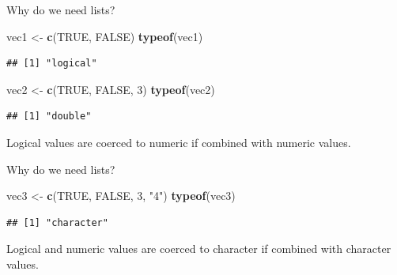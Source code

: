 \documentclass[ignorenonframetext,]{beamer}
\newenvironment{Shaded}{\begin{snugshade}}{\end{snugshade}}
\newcommand{\DecValTok}[1]{\textcolor[rgb]{0.00,0.00,0.81}{#1}}
\newcommand{\KeywordTok}[1]{\textcolor[rgb]{0.13,0.29,0.53}{\textbf{#1}}}
\newcommand{\NormalTok}[1]{#1}
\newcommand{\OtherTok}[1]{\textcolor[rgb]{0.56,0.35,0.01}{#1}}
\newcommand{\StringTok}[1]{\textcolor[rgb]{0.31,0.60,0.02}{#1}}
\begin{document}
\begin{frame}[fragile]{Why do we need lists?}
\protect\hypertarget{why-do-we-need-lists-1}{}

\begin{Shaded}
\begin{Highlighting}[]
\NormalTok{vec1 <-}\StringTok{ }\KeywordTok{c}\NormalTok{(}\OtherTok{TRUE}\NormalTok{, }\OtherTok{FALSE}\NormalTok{)}
\KeywordTok{typeof}\NormalTok{(vec1)}
\end{Highlighting}
\end{Shaded}

\begin{verbatim}
## [1] "logical"
\end{verbatim}

\begin{Shaded}
\begin{Highlighting}[]
\NormalTok{vec2 <-}\StringTok{ }\KeywordTok{c}\NormalTok{(}\OtherTok{TRUE}\NormalTok{, }\OtherTok{FALSE}\NormalTok{, }\DecValTok{3}\NormalTok{)}
\KeywordTok{typeof}\NormalTok{(vec2)}
\end{Highlighting}
\end{Shaded}

\begin{verbatim}
## [1] "double"
\end{verbatim}

Logical values are coerced to numeric if combined with numeric values.

\end{frame}

\begin{frame}[fragile]{Why do we need lists?}
\protect\hypertarget{why-do-we-need-lists-2}{}

\begin{Shaded}
\begin{Highlighting}[]
\NormalTok{vec3 <-}\StringTok{ }\KeywordTok{c}\NormalTok{(}\OtherTok{TRUE}\NormalTok{, }\OtherTok{FALSE}\NormalTok{, }\DecValTok{3}\NormalTok{, }\StringTok{"4"}\NormalTok{)}
\KeywordTok{typeof}\NormalTok{(vec3)}
\end{Highlighting}
\end{Shaded}

\begin{verbatim}
## [1] "character"
\end{verbatim}

Logical and numeric values are coerced to character if combined with
character values.

\end{frame}
\end{document}
